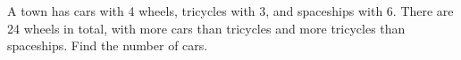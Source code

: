 A town has cars with 4 wheels, tricycles with 3, and spaceships with 6. There are 24 wheels in total, with more cars than tricycles and more tricycles than spaceships. Find the number of cars.
